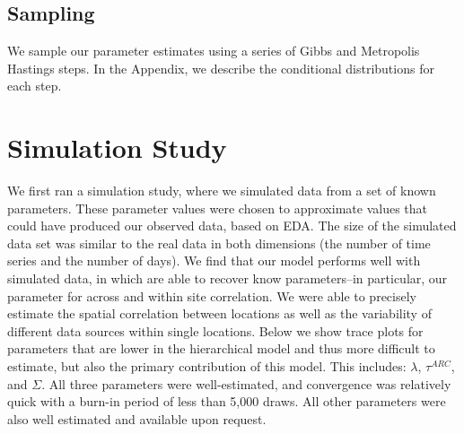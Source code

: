 \documentclass[12pt]{article}
\begin{document}
\subsection{Sampling}
We sample our parameter estimates using a series of Gibbs and Metropolis Hastings steps. In the Appendix, we describe the conditional distributions for each step.


\section{Simulation Study}
\label{sec:sim}
We first ran a simulation study, where we simulated data from a set of known parameters. These parameter values were chosen to approximate values that could have produced our observed data, based on EDA. The size of the simulated data set was similar to the real data in both dimensions (the number of time series and the number of days). We find that our model performs well with simulated data, in which are able to recover know parameters--in particular, our parameter for across and within site correlation. We were able to precisely estimate the spatial correlation between locations as well as the variability of different data sources within single locations. Below we show trace plots for parameters that are lower in the hierarchical model and thus more difficult to estimate, but also the primary contribution of this model. This includes: $\lambda$, $\tau^{ARC}$, and $\Sigma$. All three parameters were well-estimated, and convergence was relatively quick with a burn-in period of less than 5,000 draws. All other parameters were also well estimated and available upon request. 





\end{document}
